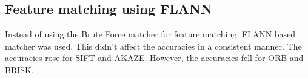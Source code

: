 \documentclass{article}
\begin{document}
\subsection{Feature matching using FLANN}
Instead of using the Brute Force matcher for feature matching, FLANN based matcher was used. This didn't affect the accuracies in a consistent manner. The accuracies rose for SIFT and AKAZE. However, the accuracies fell for ORB and BRISK.

\end{document}
